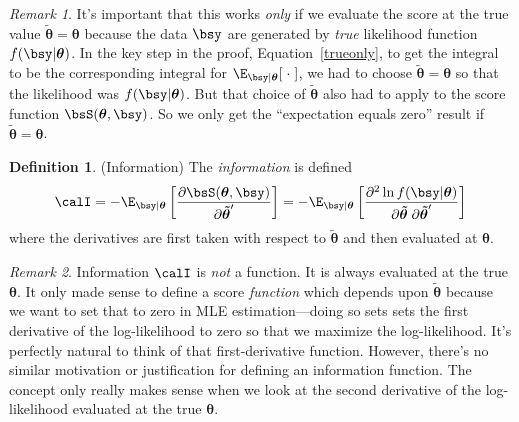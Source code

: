 \documentclass[12pt]{article}
\theoremstyle{plain}
\theoremstyle{definition}
\newtheorem{defn}[thm]{Definition}
\theoremstyle{remark}
\newtheorem*{rmk}{Remark}
\newcommand{\bstheta}{\boldsymbol{\theta}}
\newcommand{\bstildetheta}{\boldsymbol{\tilde{\theta}}}
\begin{document}
\begin{rmk}
It's important that this works \emph{only} if we evaluate the score at
the true value $\bstildetheta=\bstheta$ because the data $\bsy$ are
generated by \emph{true} likelihood function $f(\bsy|\bstheta)$.
In the key step in the proof, Equation~\ref{trueonly}, to get the
integral to be the corresponding integral for
$\E_{\bsy|\bstheta}[\;\cdot\;]$, we had to choose
$\bstildetheta=\bstheta$ so that the likelihood was $f(\bsy|\bstheta)$.
But that choice of $\bstildetheta$ also had to apply to the score
function $\bsS(\bstheta,\bsy)$. So we only get the ``expectation equals
zero'' result if $\bstildetheta=\bstheta$.
\end{rmk}

\begin{defn}(Information)
The \emph{information} is defined
\begin{align*}
  \calI
  =
  -\E_{\bsy|\bstheta}\left[
    \frac{\partial \bsS(\bstheta,\bsy)}{\partial \bstildetheta'}
  \right]
  =
  -\E_{\bsy|\bstheta}\left[
    \frac{\partial^2 \ln f(\bsy|\bstheta)}{%
      \partial\bstildetheta\;\partial\bstildetheta'}
  \right]
\end{align*}
where the derivatives are first taken with respect to $\bstildetheta$
and then evaluated at $\bstheta$.
\end{defn}
\begin{rmk}
Information $\calI$ is \emph{not} a function. It is always evaluated at
the true $\bstheta$. It only made sense to define a score
\emph{function} which depends upon $\bstildetheta$ because we want to
set that to zero in MLE estimation---doing so sets sets the first
derivative of the log-likelihood to zero so that we maximize the
log-likelihood. It's perfectly natural to think of that first-derivative
function. However, there's no similar motivation or justification for
defining an information function.  The concept only really makes sense
when we look at the second derivative of the log-likelihood evaluated at
the true $\bstheta$.
\end{rmk}
\end{document}
